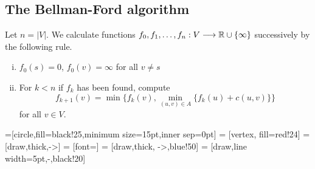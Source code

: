 \subsection*{The Bellman-Ford algorithm}

Let $n=|V|$. We calculate functions $f_0,f_1,\ldots,f_n:V\longrightarrow\mathbb{R}\cup\{\infty\}$
successively by the following rule. 

\begin{enumerate}[i)]
\item $f_0(s) = 0$, $f_0(v) = \infty$ for all $v \neq s$ 
\item For $k<n$ if $f_k$ has been found, compute 
  \begin{displaymath}
    \displaystyle f_{k+1}(v) = \min\{f_k(v), \min_{(u,v)\in A}\{f_k(u)+c(u,v)\} \}  
  \end{displaymath}
  for all $v \in V$. 
\end{enumerate}






  =[circle,fill=black!25,minimum size=15pt,inner sep=0pt]
   = [vertex, fill=red!24]
   = [draw,thick,->]
   = [font=\small]
   = [draw,thick, ->,blue!50]
   = [draw,line width=5pt,-,black!20]

